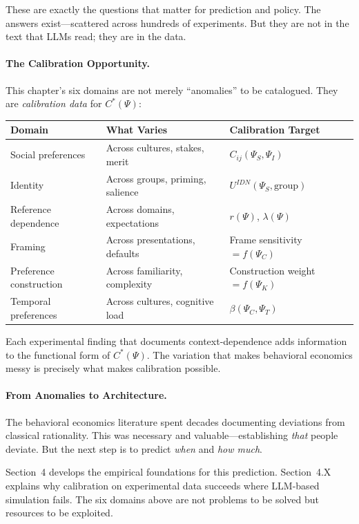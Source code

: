 These are exactly the questions that matter for prediction and policy.
The answers exist---scattered across hundreds of experiments.
But they are not in the text that LLMs read; they are in the data.

\paragraph{The Calibration Opportunity.}
This chapter's six domains are not merely ``anomalies'' to be catalogued.
They are \emph{calibration data} for $C^*(\Psi)$:

\begin{center}
\small
\begin{tabular}{lll}
\toprule
\textbf{Domain} & \textbf{What Varies} & \textbf{Calibration Target} \\
\midrule
Social preferences & Across cultures, stakes, merit & $C_{ij}(\Psi_S, \Psi_I)$ \\
Identity & Across groups, priming, salience & $U^{IDN}(\Psi_S, \text{group})$ \\
Reference dependence & Across domains, expectations & $r(\Psi)$, $\lambda(\Psi)$ \\
Framing & Across presentations, defaults & Frame sensitivity $= f(\Psi_C)$ \\
Preference construction & Across familiarity, complexity & Construction weight $= f(\Psi_K)$ \\
Temporal preferences & Across cultures, cognitive load & $\beta(\Psi_C, \Psi_T)$ \\
\bottomrule
\end{tabular}
\end{center}

Each experimental finding that documents context-dependence adds information
to the functional form of $C^*(\Psi)$. The variation that makes behavioral
economics messy is precisely what makes calibration possible.

\paragraph{From Anomalies to Architecture.}
The behavioral economics literature spent decades documenting deviations from
classical rationality. This was necessary and valuable---establishing \emph{that}
people deviate. But the next step is to predict \emph{when} and \emph{how much}.

Section~4 develops the empirical foundations for this prediction.
Section~4.X explains why calibration on experimental data succeeds where
LLM-based simulation fails. The six domains above are not problems to be
solved but resources to be exploited.

